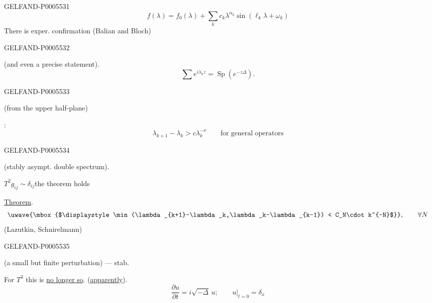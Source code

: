 \begin{GelfandAdjacentEvidence}{GELFAND-P000553}{1}
\[
f(\lambda)=f_0(\lambda)+\sum_k c_k\lambda^{\alpha_k}
\sin(\ell_k\lambda+\omega_k)
\]
There is exper. confirmation (Balian and Bloch)
\end{GelfandAdjacentEvidence}
\begin{GelfandAdjacentEvidence}{GELFAND-P000553}{2}

(and even a precise statement).
\[
\sum e^{i\lambda_k z}=\operatorname{Sp}(e^{-z\Delta}).
\]
\end{GelfandAdjacentEvidence}
\begin{GelfandAdjacentEvidence}{GELFAND-P000553}{3}

 (from the upper half-plane)

:
\[
\lambda_{k+1}-\lambda_k>c\lambda_k^{-\nu}
\qquad\text{for general operators}
\]
\end{GelfandAdjacentEvidence}
\begin{GelfandAdjacentEvidence}{GELFAND-P000553}{4}

 (stably asympt. double spectrum).

\(T^2\)\qquad \(g_{ij}\sim\delta_{ij}\)\qquad the theorem holds

\uline{Theorem}.
\[
\uwave{\mbox{$\displaystyle\min(\lambda_{k+1}-\lambda_k,\lambda_k-\lambda_{k-1})
< C_N\cdot k^{-N}$}},\qquad \forall N
\]
(Lazutkin, Schnirelmann)
\end{GelfandAdjacentEvidence}
\begin{GelfandAdjacentEvidence}{GELFAND-P000553}{5}

(a small but finite perturbation) — stab.

For \(T^3\) this is \uline{no longer so}. (\uline{apparently}).
\[
\frac{\partial u}{\partial t}=i\sqrt{-\Delta}\,u;\qquad
\left.u\right|_{t=0}=\delta_x
\]
\end{GelfandAdjacentEvidence}
